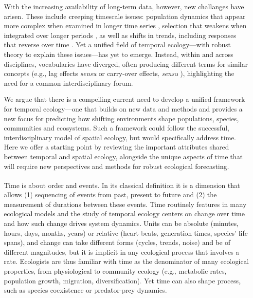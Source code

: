 \documentclass[11pt,a4paper,oneside]{article}
\begin{document}
With the increasing availability of long-term data, however, new challanges have arisen. These include creeping timescale issues: population dynamics that appear more complex when examined in longer time series \citep{Ziebarth2010}, selection that weakens when integrated over longer periods \citep{schoener2011,Uyeda2011}, as well as shifts in trends, including responses that reverse over time \citep{yu2010}. Yet a unified field of temporal ecology---with robust theory to explain these issues---has yet to emerge. Instead, within and across disciplines, vocabularies have diverged, often producing different terms for similar concepts (e.g., lag effects \emph{sensu} \cite{Reichmann2013} or carry-over effects, \emph{sensu} \cite{Betini2013}), highlighting the need for a common interdisciplinary forum. 

We argue that there is a compelling current need to develop a unified framework for temporal ecology---one that builds on new data and methods and provides a new focus for predicting how shifting environments shape populations, species, communities and ecosystems. Such a framework could follow the successful, interdisciplinary model of spatial ecology, but would specifically address time. Here we offer a starting point by reviewing the important attributes shared between temporal and spatial ecology, alongside the unique aspects of time that will require new perspectives and methods for robust ecological forecasting. \\

\\

\noindent  Time is about order and events. In its classical definition it is a dimension that allows (1) sequencing of events from past, present to future and (2) the measurement of durations between these events. Time routinely features in many ecological models and the study of temporal ecology centers on change over time and how such change drives system dynamics. Units can be absolute (minutes, hours, days, months, years) or relative (heart beats, generation times, species’ life spans), and change can take different forms (cycles, trends, noise) and be of different magnitudes, but it is implicit in any ecological process that involves a rate. Ecologists are thus familiar with time as the denominator of many ecological properties, from physiological to community ecology (e.g., metabolic rates, population growth, migration, diversification). Yet time can also shape process, such as species coexistence or predator-prey dynamics. 
\end{document}
